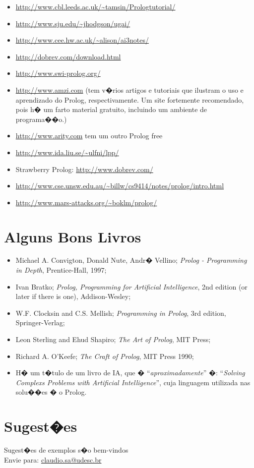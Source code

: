 \documentclass[final,a4paper]{article}
\begin{document}
\begin{itemize}
\item  \url{http://www.cbl.leeds.ac.uk/~tamsin/Prologtutorial/}
\item  \url{http://www.sju.edu/~jhodgson/ugai/}
\item  \url{http://www.cee.hw.ac.uk/~alison/ai3notes/}
\item  \url{http://dobrev.com/download.html}
\item  \url{http://www.swi-prolog.org/}
\item  \url{http://www.amzi.com} (tem v�rios artigos e tutoriais
  que ilustram o uso e aprendizado do Prolog, respectivamente. Um site fortemente recomendado,
  pois h� um farto material gratuito, incluindo
  um ambiente de programa��o.)
\item  \url{http://www.arity.com} tem um outro Prolog free
\item  \url{http://www.ida.liu.se/~ulfni/lpp/}
\item  Strawberry Prolog:  \url{http://www.dobrev.com/}
\item  \url{http://www.cse.unsw.edu.au/~billw/cs9414/notes/prolog/intro.html}
\item \url{http://www.mars-attacks.org/~boklm/prolog/}
\end{itemize}


\section{Alguns Bons Livros}

\begin{itemize}
\item Michael A. Convigton, Donald
Nute, Andr� Vellino; {\em Prolog - Programming in Depth},
Prentice-Hall, 1997;

\item Ivan Bratko; {\em Prolog, Programming
for Artificial Intelligence}, 2nd edition (or later if there is
one), Addison-Wesley;

\item W.F. Clocksin and C.S. Mellish;  {\em Programming in Prolog}, 3rd edition, Springer-Verlag;

\item Leon Sterling and Ehud Shapiro; {\em The Art of Prolog}, MIT Press;

\item Richard A. O'Keefe; {\em The Craft of Prolog}, MIT Press
1990;

\item  H� um t�tulo de um livro de IA, que �
``{\em aproximadamente}'' �: ``{\em Solving Complexs Problems with Artificial
Intelligence}'',  cuja linguagem utilizada nas solu��es � o Prolog.


\end{itemize}

\section{Sugest�es}


\begin{center}
 Sugest�es de exemplos s�o bem-vindos\\
 Envie para: \url{claudio.sa@udesc.br}\\
\end{center}
\end{document}

